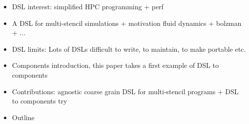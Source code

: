 \begin{itemize}
\item DSL interest: simplified HPC programming + perf
\item A DSL for multi-stencil simulations + motivation fluid dynamics + bolzman + ...
\item DSL limits: Lots of DSLs difficult to write, to maintain, to make portable etc.
\item Components introduction, this paper takes a first example of DSL to components
\item Contributions: agnostic coarse grain DSL for multi-stencil programs + DSL to components try
\item Outline
\end{itemize}